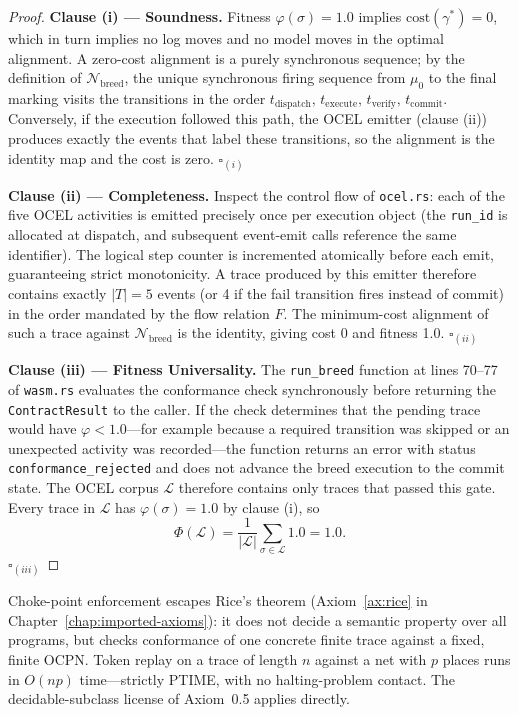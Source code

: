 \begin{proof}
\textbf{Clause (i) --- Soundness.}
Fitness $\varphi(\sigma) = 1.0$ implies $\mathrm{cost}(\gamma^*) = 0$,
which in turn implies no log moves and no model moves in the optimal
alignment.  A zero-cost alignment is a purely synchronous sequence; by the
definition of $\mathcal{N}_{\mathrm{breed}}$, the unique synchronous
firing sequence from $\mu_0$ to the final marking visits the transitions in
the order $t_{\mathrm{dispatch}},\, t_{\mathrm{execute}},\,
t_{\mathrm{verify}},\, t_{\mathrm{commit}}$.  Conversely, if the execution
followed this path, the OCEL emitter (clause (ii)) produces exactly the
events that label these transitions, so the alignment is the identity map
and the cost is zero.  \qquad $\square_{(i)}$

\medskip\noindent
\textbf{Clause (ii) --- Completeness.}
Inspect the control flow of \texttt{ocel.rs}: each of the five OCEL
activities is emitted precisely once per execution object (the
\texttt{run\_id} is allocated at dispatch, and subsequent event-emit calls
reference the same identifier).  The logical step counter is incremented
atomically before each emit, guaranteeing strict monotonicity.  A trace
produced by this emitter therefore contains exactly $|T| = 5$ events (or
4 if the fail transition fires instead of commit) in the order mandated by
the flow relation $F$.  The minimum-cost alignment of such a trace against
$\mathcal{N}_{\mathrm{breed}}$ is the identity, giving cost 0 and fitness
1.0.  \qquad $\square_{(ii)}$

\medskip\noindent
\textbf{Clause (iii) --- Fitness Universality.}
The \texttt{run\_breed} function at lines 70--77 of \texttt{wasm.rs}
evaluates the conformance check synchronously before returning the
\texttt{ContractResult} to the caller.  If the check determines that the
pending trace would have $\varphi < 1.0$---for example because a required
transition was skipped or an unexpected activity was recorded---the function
returns an error with status \texttt{conformance\_rejected} and does not
advance the breed execution to the commit state.  The OCEL corpus
$\mathcal{L}$ therefore contains only traces that passed this gate.  Every
trace in $\mathcal{L}$ has $\varphi(\sigma) = 1.0$ by clause (i), so
\[
  \Phi(\mathcal{L})
  = \frac{1}{|\mathcal{L}|} \sum_{\sigma \in \mathcal{L}} 1.0
  = 1.0.
\]
\qquad $\square_{(iii)}$
\end{proof}

\begin{remark}
Choke-point enforcement escapes Rice's theorem (Axiom~\ref{ax:rice} in Chapter~\ref{chap:imported-axioms}): it does not decide a semantic property over all programs, but checks conformance of one concrete finite trace against a fixed, finite OCPN. Token replay on a trace of length $n$ against a net with $p$ places runs in $O(np)$ time---strictly PTIME, with no halting-problem contact. The decidable-subclass license of Axiom~0.5 applies directly.
\end{remark}

